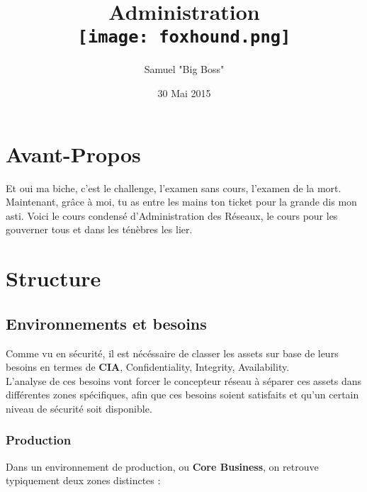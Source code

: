 \documentclass{report}
\title{Administration\\\texttt{[image: foxhound.png]}}
\author{Samuel "Big Boss" \bsc{Monroe}}
\date{30 Mai 2015}
\begin{document}
\maketitle

\newpage
\thispagestyle{empty}
\mbox{}

\tableofcontents


\chapter{Avant-Propos}

	Et oui ma biche, c'est le challenge, l'examen sans cours, l'examen de la mort.\\

	Maintenant, grâce à moi, tu as entre les mains ton ticket pour la grande dis mon asti. Voici le cours condensé d'Administration des Réseaux, le cours pour les gouverner tous et dans les ténèbres les lier.\\

\chapter{Structure}

	\section{Environnements et besoins}

		Comme vu en sécurité, il est nécéssaire de classer les assets sur base de leurs besoins en termes de \textbf{CIA}, Confidentiality, Integrity, Availability.\\
		L'analyse de ces besoins vont forcer le concepteur réseau à séparer ces assets dans différentes zones spécifiques, afin que ces besoins soient satisfaits et qu'un certain niveau de sécurité soit disponible.\\

		\subsection{Production}

			Dans un environnement de production, ou \textbf{Core Business}, on retrouve typiquement deux zones distinctes : \\
\end{document}
